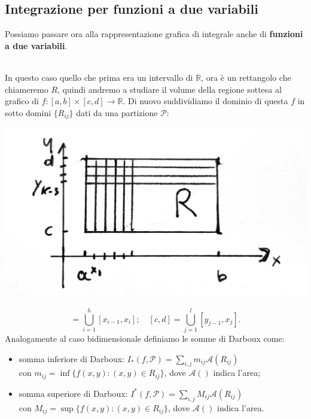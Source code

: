 \documentclass[10pt]{article}
\theoremstyle{plain}
\theoremstyle{definition}
\begin{document}
\subsection{Integrazione per funzioni a due variabili}
\bigskip Possiamo passare ora alla rappresentazione grafica di integrale anche di \textbf{funzioni a due variabili}. \\ \\
\begin{minipage}{.6\textwidth}
In questo caso quello che prima era un intervallo di $\mathbb{R}$, ora è un rettangolo che chiameremo $R$, quindi andremo a studiare il volume della regione sottesa al grafico di $f:[a,b]\times[c,d]\to \mathbb{R}$. Di nuovo suddividiamo il dominio di questa $f$ in sotto domini $\{R_{ij}\}$ dati da una partizione $\mathcal{P}$:
\end{minipage}%
\begin{minipage}{.50\textwidth}
\centering
\includegraphics[width=.9\textwidth]{fig3.jpg}
\end{minipage}
\begin{equation*}
    [a,b]=\bigcup_{i=1}^h[x_{i-1},x_i]; \quad [c,d]=\bigcup_{j=1}^l[y_{j-1},x_j].
\end{equation*}
Analogamente al caso bidimensionale definiamo le somme di Darboux come:
\begin{itemize}
    \item somma inferiore di Darboux: $I_*(f,\mathcal{P})=\sum_{i,j}m_{ij}\mathcal{A}(R_{ij})$ 
    \\ con $m_{ij}=\inf\{ f(x,y): (x,y)\in R_{ij}\}$, dove $\mathcal{A}()$ indica l'area;
    \item somma superiore di Darboux: $I^*(f,\mathcal{P})=\sum_{i,j}M_{ij}\mathcal{A}(R_{ij})$ 
    \\ con $M_{ij}=\sup\{ f(x,y): (x,y)\in R_{ij}\}$, dove $\mathcal{A}()$ indica l'area.
\end{itemize}
\end{document}

